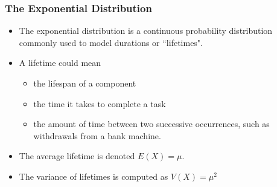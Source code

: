 \documentclass[a4]{beamer}
\begin{document}
\begin{frame}
\frametitle{The Exponential Distribution}
\begin{itemize}
\item The exponential distribution is a continuous probability distribution commonly used to model durations or ``lifetimes".
\item A lifetime could mean
\begin{itemize}
\large
\item the lifespan of a component
\item the time it takes to complete a task
\item the amount of time between two successive occurrences, such as withdrawals from a bank machine.
\end{itemize}
\item The average lifetime is denoted $E(X) = \mu$.
\item The variance of lifetimes is computed as $V(X) = \mu^2$
\end{itemize}
\end{frame}
\end{document}
